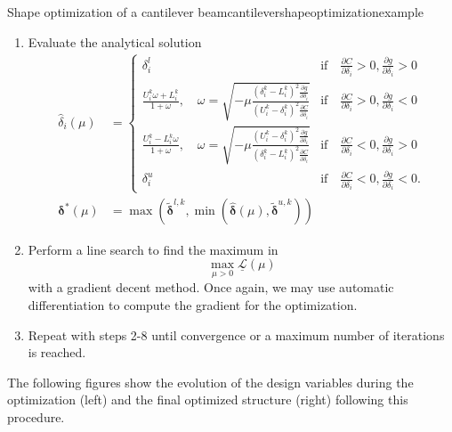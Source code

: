\begin{example}{Shape optimization of a cantilever beam}{cantilevershapeoptimizationexample}
\begin{enumerate}
        \item Evaluate the analytical solution
            \begin{align}
                \hat{\delta}_i(\mu) &= 
                \begin{cases}
                    \delta^l_i 
                        &\textrm{if} \quad \frac{\partial C}{\partial \delta_i} > 0, \frac{\partial g}{\partial \delta_i} > 0 \\
                    \frac{U_i^k\omega + L_i^k}{1+\omega}, \quad \omega = \sqrt{-\mu\frac{(\delta_i^k-L_i^k)^2\frac{\partial g}{\partial \delta_i}}{(U_i^k-\delta_i^k)^2\frac{\partial C}{\partial \delta_i}}}
                        &\textrm{if} \quad \frac{\partial C}{\partial \delta_i}  > 0, \frac{\partial g}{\partial \delta_i} <0\\
                    \frac{U_i^k-L_i^k\omega}{1+\omega}, \quad \omega = \sqrt{-\mu\frac{(U_i^k-\delta_i^k)^2\frac{\partial g}{\partial \delta_i}}{(\delta_i^k-L_i^k)^2\frac{\partial C}{\partial \delta_i}}} 
                        &\textrm{if} \quad \frac{\partial C}{\partial \delta_i} < 0, \frac{\partial g}{\partial \delta_i}  > 0\\
                    \delta^u_i 
                        &\textrm{if} \quad \frac{\partial C}{\partial \delta_i}< 0, \frac{\partial g}{\partial \delta_i} < 0.
                \end{cases} \\
                \pmb{\delta}^* (\mu) &= \max\left(\tilde{\pmb{\delta}}^{l,k}, \min \left(\hat{\pmb{\delta}}(\mu), \tilde{\pmb{\delta}}^{u,k} \right)\right)
            \end{align}
        \item Perform a line search to find the maximum in 
            \begin{equation}
                \max_{\mu>0} \underline{\mathcal{L}}(\mu)
            \end{equation}
            with a gradient decent method. Once again, we may use automatic differentiation to compute the gradient for the optimization.
        \item Repeat with steps 2-8 until convergence or a maximum number of iterations is reached.
    \end{enumerate}
    
    The following figures show the evolution of the design variables during the optimization (left) and the final optimized structure (right) following this procedure. 


\end{example}
